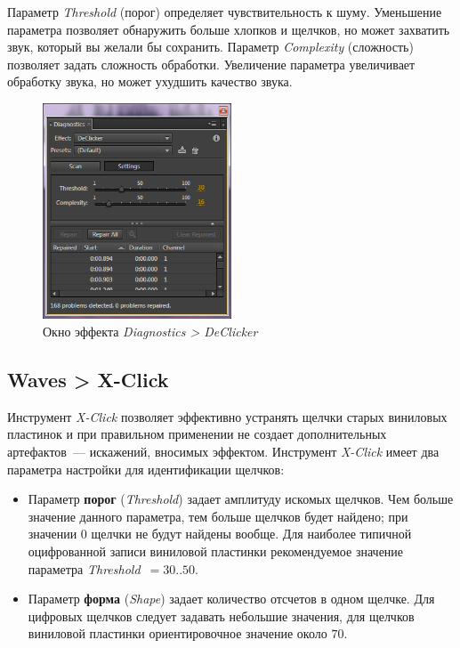 \documentclass[oneside, final, 14pt]{extreport}
\begin{document}
Параметр \textit{Threshold} (порог) определяет чувствительность к шуму. Уменьшение параметра позволяет обнаружить больше хлопков и щелчков, но может захватить звук, который вы желали бы сохранить. Параметр \textit{Complexity} (сложность) позволяет задать сложность обработки. Увеличение параметра увеличивает обработку звука, но может ухудшить качество звука.

\begin{figure}[h]
\centering
\includegraphics[width=0.5\textwidth]{pic-click-03}
\caption{Окно эффекта \textit{Diagnostics > DeClicker}}
\label{pic-click-03}
\end{figure}

\subsection{Waves > X-Click}
Инструмент \emph{X-Click} позволяет эффективно устранять щелчки старых виниловых пластинок и при правильном применении не создает дополнительных артефактов~--- искажений, вносимых эффектом. Инструмент \emph{X-Click} имеет два параметра настройки для идентификации щелчков:
\begin{itemize}
  \item Параметр \textbf{порог} (\textit{Threshold}) задает амплитуду искомых щелчков. Чем больше значение данного параметра, тем больше щелчков будет найдено; при значении  0 щелчки не будут найдены вообще. Для наиболее типичной оцифрованной записи виниловой пластинки рекомендуемое значение параметра \emph{Threshold}~$=30..50$.
  \item Параметр \textbf{форма} (\textit{Shape}) задает количество отсчетов в одном щелчке. Для цифровых щелчков следует задавать небольшие значения, для щелчков виниловой пластинки ориентировочное значение около $70$.
\end{itemize}
\end{document}
